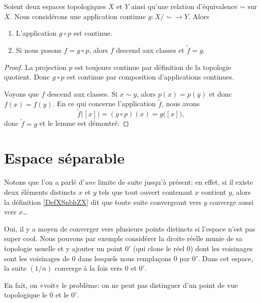 \begin{lemma}
	Soient deux espaces topologiques \( X\) et \( Y\) ainsi qu'une relation d'équivalence \( \sim\) sur \( X\). Nous considérons une application continue \( g\colon X/\sim\to Y\). Alors
	\begin{enumerate}
		\item
		      L'application \( g\circ p\) est continue.
		\item
		      Si nous posons \( f=g\circ p\), alors \( f\) descend aux classes et \( \tilde f=g\).
	\end{enumerate}
\end{lemma}

\begin{proof}
	La projection \( p\) est toujours continue par définition de la topologie quotient. Donc \( g\circ p\) est continue par composition d'applications continues.

	Voyons que \( f\) descend aux classes. Si \( x\sim y\), alors \( p(x)=p(y)\) et donc \( f(x)=f(y)\). En ce qui concerne l'application \( \tilde f\), nous avons
	\begin{equation}
		\tilde f\big( [x] \big)=(g\circ p)(x)=g\big( [x] \big),
	\end{equation}
	donc \( \tilde f=g\) et le lemme est démontré.
\end{proof}


\section{Espace séparable}

Notons que l'on a parlé d'\emph{une} limite de suite jusqu'à présent: en effet, si il existe deux éléments distincts \( x\) et \( y\) tels que tout ouvert contenant \( x\) contient \( y\), alors la définition \ref{DefXSnbhZX} dit que toute suite convergeant vers \( y\) converge aussi vers \( x\)\dots


\begin{example} \label{EXooSHKAooZQEVLB}
	Oui, il y a moyen de converger vers plusieurs points distincts si l'espace n'est pas super cool. Nous pouvons par exemple \cite{EJVQuas} considérer la droite réelle munie de sa topologie usuelle et y ajouter un point \( 0'\) (qui clone le réel \( 0\)) dont les voisinages sont les voisinages de \( 0\) dans lesquels nous remplaçons \( 0\) par \( 0'\). Dans cet espace, la suite \( (1/n)\) converge à la fois vers \( 0\) et \( 0'\).

	En fait, on «voit» le problème: on ne peut pas distinguer d'un point de vue topologique le \( 0\) et le \( 0'\).
\end{example}

